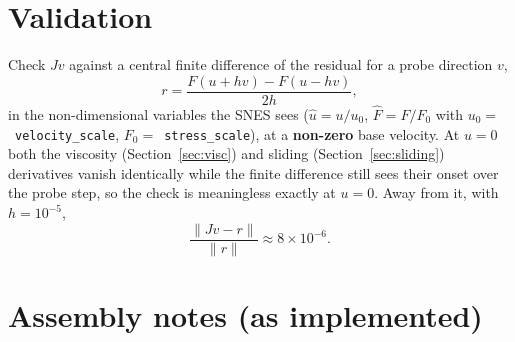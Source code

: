 \documentclass[11pt]{article}
\newcommand{\code}[1]{\texttt{#1}}
\begin{document}
\section{Validation}
\label{sec:validation}

Check $Jv$ against a central finite difference of the residual for a probe
direction $v$,
\begin{equation}
r = \frac{F(u+hv) - F(u-hv)}{2h},
\end{equation}
in the non-dimensional variables the SNES sees ($\hat u = u/u_0$, $\hat F =
F/F_0$ with $u_0=$~\code{velocity\_\allowbreak scale}, $F_0=$~\code{stress\_\allowbreak scale}), at a
\textbf{non-zero} base velocity. At $u=0$ both the viscosity
(Section~\ref{sec:visc}) and sliding (Section~\ref{sec:sliding}) derivatives
vanish identically while the finite difference still sees their onset over the
probe step, so the check is meaningless exactly at $u=0$. Away from it, with
$h=10^{-5}$,
\begin{equation}
\frac{\lVert Jv - r\rVert}{\lVert r\rVert} \approx 8\times10^{-6}.
\end{equation}

\section{Assembly notes (as implemented)}
\label{sec:assembly}
\end{document}
